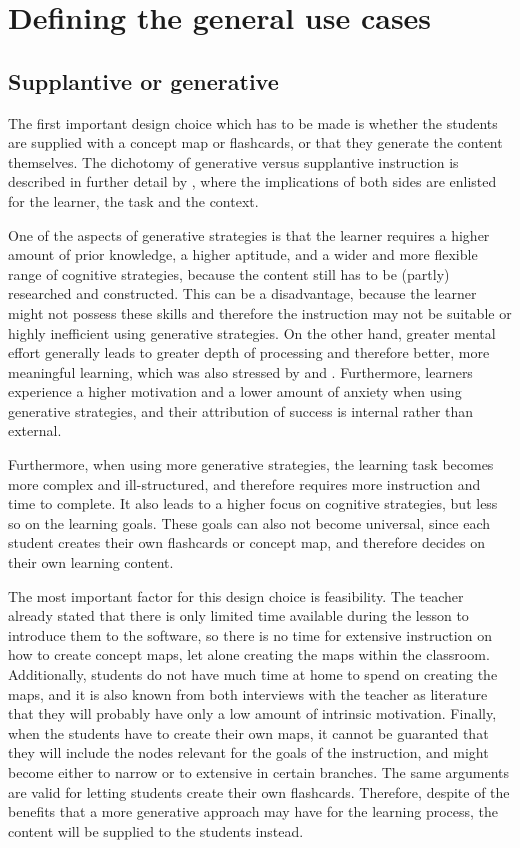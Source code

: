 \chapter{Defining the general use cases}
\label{ch:usecases}

\section{Supplantive or generative}

The first important design choice which has to be made is whether the students are supplied with a concept map or flashcards, or that they generate the content themselves. The dichotomy of generative versus supplantive instruction is described in further detail by , where the implications of both sides are enlisted for the learner, the task and the context.

One of the aspects of generative strategies is that the learner requires a higher amount of prior knowledge, a higher aptitude, and a wider and more flexible range of cognitive strategies, because the content still has to be (partly) researched and constructed. This can be a disadvantage, because the learner might not possess these skills and therefore the instruction may not be suitable or highly inefficient using generative strategies. On the other hand, greater mental effort generally leads to greater depth of processing and therefore better, more meaningful learning, which was also stressed by  and . Furthermore, learners experience a higher motivation and a lower amount of anxiety when using generative strategies, and their attribution of success is internal rather than external. 

Furthermore, when using more generative strategies, the learning task becomes more complex and ill-structured, and therefore requires more instruction and time to complete. It also leads to a higher focus on cognitive strategies, but less so on the learning goals. These goals can also not become universal, since each student creates their own flashcards or concept map, and therefore decides on their own learning content.

The most important factor for this design choice is feasibility. The teacher already stated that there is only limited time available during the lesson to introduce them to the software, so there is no time for extensive instruction on how to create concept maps, let alone creating the maps within the classroom. Additionally, students do not have much time at home to spend on creating the maps, and it is also known from both interviews with the teacher as literature that they will probably have only a low amount of intrinsic motivation. Finally, when the students have to create their own maps, it cannot be guaranted that they will include the nodes relevant for the goals of the instruction, and might become either to narrow or to extensive in certain branches. The same arguments are valid for letting students create their own flashcards. Therefore, despite of the benefits that a more generative approach may have for the learning process, the content will be supplied to the students instead.

